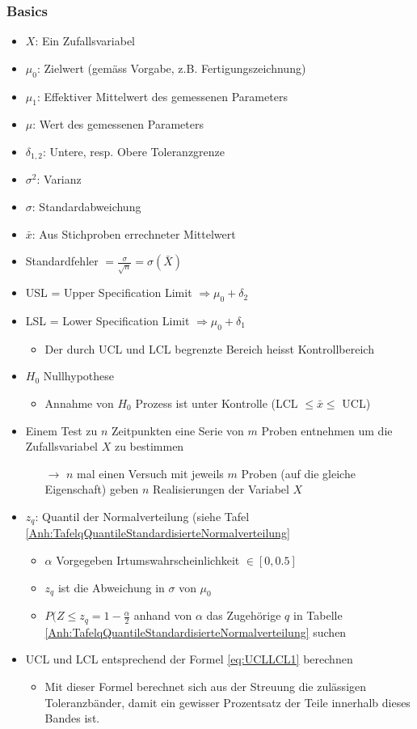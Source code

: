 \subsubsection{Basics}
\begin{itemize}
	\item $X$: Ein Zufallsvariabel
	\item $\mu_0$: Zielwert (gemäss Vorgabe, z.B. Fertigungszeichnung)
	\item $\mu_1$: Effektiver Mittelwert des gemessenen Parameters
	\item $\mu$: Wert des gemessenen Parameters
	\item $\delta_{1,2}$: Untere, resp. Obere Toleranzgrenze
	\item $\sigma^2$: Varianz
	\item $\sigma$: Standardabweichung
	\item $\bar{x}$: Aus Stichproben errechneter Mittelwert
	\item Standardfehler $=\frac{\sigma}{\sqrt{n}} = \sigma(\bar{X})$
	\item USL = Upper Specification Limit $\Rightarrow \mu_0+\delta_2$
	\item LSL = Lower Specification Limit $\Rightarrow \mu_0+\delta_1$
	\begin{itemize}
		\item Der durch UCL und LCL begrenzte Bereich heisst Kontrollbereich
	\end{itemize}
	\item $H_0$ Nullhypothese
	\begin{itemize}
		\item Annahme von $H_0$ Prozess ist unter Kontrolle (LCL $\leq \bar{x} \leq$ UCL)
	\end{itemize}
	\item Einem Test zu $n$ Zeitpunkten eine Serie von $m$ Proben entnehmen um die Zufallsvariabel $X$ zu bestimmen
	\begin{itemize}
		\item [$\rightarrow$] $n$ mal einen Versuch mit jeweils $m$ Proben (auf die gleiche Eigenschaft) geben $n$ Realisierungen der Variabel $X$
	\end{itemize}
	\item $z_q$: Quantil der Normalverteilung (siehe Tafel \ref{Anh:TafelqQuantileStandardisierteNormalverteilung}
	\begin{itemize}
		\item $\alpha$ Vorgegeben Irtumswahrscheinlichkeit $\in \left[0,0.5\right]$
		\item $z_q$ ist die Abweichung in $\sigma$ von $\mu_0$ 
		\item $P(Z\leq z_q =1-\frac{\alpha}{2}$ anhand von $\alpha$ das Zugehörige $q$ in Tabelle \ref{Anh:TafelqQuantileStandardisierteNormalverteilung} suchen
	\end{itemize}
	\item UCL und LCL entsprechend der Formel \ref{eq:UCLLCL1}  berechnen
	\begin{itemize}
		\item Mit dieser Formel berechnet sich aus der Streuung die zulässigen Toleranzbänder, damit ein gewisser Prozentsatz der Teile innerhalb dieses Bandes ist. 
	\end{itemize}
\end{itemize}
